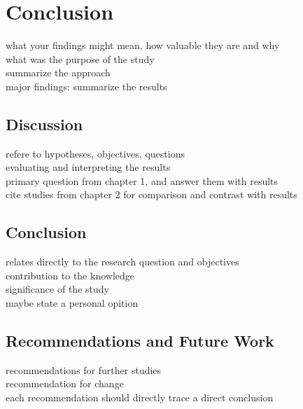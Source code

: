 \chapter{Conclusion}
\label{ch:conclusion}

what your findings might mean, how valuable they are and why\\

what was the purpose of the study\\
summarize the approach\\
major findings: summarize the results\\


\section{Discussion}
refere to hypotheses, objectives, questions\\
evaluating and interpreting the results\\
primary question from chapter 1, and answer them with results\\
cite studies from chapter 2 for comparison and contrast with results\\


\section{Conclusion}
relates directly to the research question and objectives\\
contribution to the knowledge\\
significance of the study\\
maybe state a personal opition\\


\section{Recommendations and Future Work}
recommendations for further studies\\
recommendation for change\\
each recommendation should directly trace a direct conclusion\\